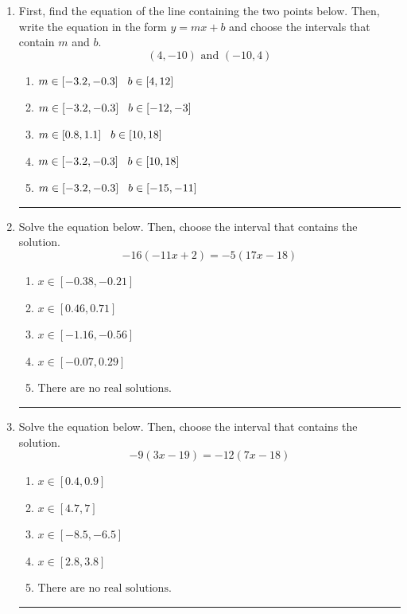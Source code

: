 \documentclass[14pt]{extbook}
\newcommand{\litem}[1]{\item#1\hspace*{-1cm}\rule{\textwidth}{0.4pt}}
\begin{document}
\begin{enumerate}
\litem{
First, find the equation of the line containing the two points below. Then, write the equation in the form $ y=mx+b $ and choose the intervals that contain $m$ and $b$.\[ (4, -10) \text{ and } (-10, 4) \]\begin{enumerate}[label=\Alph*.]
\item \( m \in [-3.2, -0.3] \hspace*{3mm} b \in [4, 12] \)
\item \( m \in [-3.2, -0.3] \hspace*{3mm} b \in [-12, -3] \)
\item \( m \in [0.8, 1.1] \hspace*{3mm} b \in [10, 18] \)
\item \( m \in [-3.2, -0.3] \hspace*{3mm} b \in [10, 18] \)
\item \( m \in [-3.2, -0.3] \hspace*{3mm} b \in [-15, -11] \)

\end{enumerate} }
\litem{
Solve the equation below. Then, choose the interval that contains the solution.\[ -16(-11x + 2) = -5(17x -18) \]\begin{enumerate}[label=\Alph*.]
\item \( x \in [-0.38, -0.21] \)
\item \( x \in [0.46, 0.71] \)
\item \( x \in [-1.16, -0.56] \)
\item \( x \in [-0.07, 0.29] \)
\item \( \text{There are no real solutions.} \)

\end{enumerate} }
\litem{
Solve the equation below. Then, choose the interval that contains the solution.\[ -9(3x -19) = -12(7x -18) \]\begin{enumerate}[label=\Alph*.]
\item \( x \in [0.4, 0.9] \)
\item \( x \in [4.7, 7] \)
\item \( x \in [-8.5, -6.5] \)
\item \( x \in [2.8, 3.8] \)
\item \( \text{There are no real solutions.} \)


\end{enumerate}}
\end{enumerate}
\end{document}
